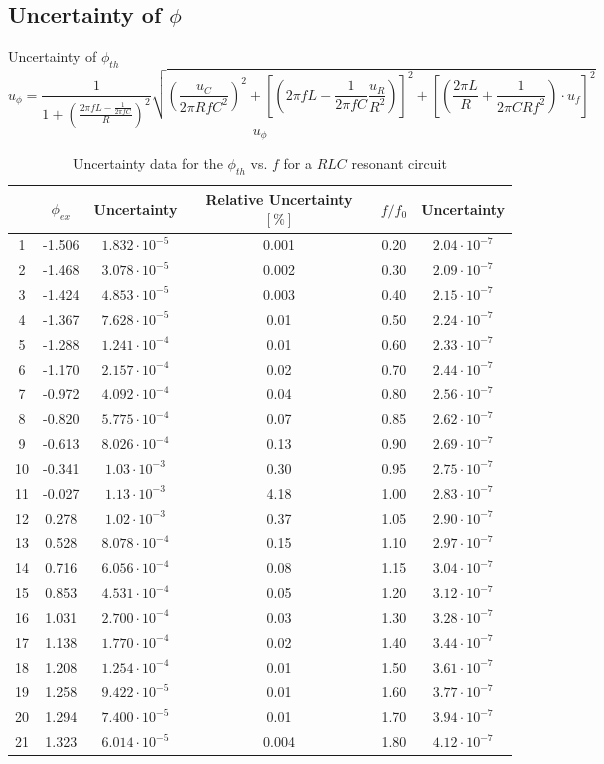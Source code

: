 \documentclass[12pt]{article}
\begin{document}
\subsection{Uncertainty of $\phi$}
\par Uncertainty of $\phi_{th}$
$$u_\phi=\frac{1}{1+(\frac{2\pi fL-\frac{1}{2\pi fC}}{R})^2}\sqrt{(\frac{u_C}{2\pi RfC^2})^2+[(2\pi fL-\frac{1}{2\pi fC}\frac{u_R}{R^2})]^2+[(\frac{2\pi L}{R}+\frac{1}{2\pi CRf^2})\cdot u_f]^2}$$
$$u_\phi$$
\begin{table}[H]
\centering
\begin{tabular}{|c|c|c|c|c|c|}
\hline
   &$\phi_{ex}$&Uncertainty&Relative Uncertainty $[\%]$&$f/f_0$&Uncertainty       \\ \hline
1  &-1.506&$1.832\cdot10^{-5}$&0.001&0.20&$2.04\cdot10^{-7}$       \\ \hline
2  &-1.468&$3.078\cdot10^{-5}$&0.002&0.30&$2.09\cdot10^{-7}$       \\ \hline
3  &-1.424&$4.853\cdot10^{-5}$&0.003&0.40&$2.15\cdot10^{-7}$       \\ \hline
4  &-1.367&$7.628\cdot10^{-5}$&0.01&0.50&$2.24\cdot10^{-7}$       \\ \hline
5  &-1.288&$1.241\cdot10^{-4}$&0.01&0.60&$2.33\cdot10^{-7}$       \\ \hline
6  &-1.170&$2.157\cdot10^{-4}$&0.02&0.70&$2.44\cdot10^{-7}$       \\ \hline
7  &-0.972&$4.092\cdot10^{-4}$&0.04&0.80&$2.56\cdot10^{-7}$       \\ \hline
8  &-0.820&$5.775\cdot10^{-4}$&0.07&0.85&$2.62\cdot10^{-7}$       \\ \hline
9  &-0.613&$8.026\cdot10^{-4}$&0.13&0.90&$2.69\cdot10^{-7}$       \\ \hline
10 &-0.341&$1.03\cdot10^{-3} $&0.30&0.95&$2.75\cdot10^{-7}$       \\ \hline
11 &-0.027&$1.13\cdot10^{-3}$ &4.18&1.00&$2.83\cdot10^{-7}$       \\ \hline
12 & 0.278&$1.02\cdot10^{-3}$ &0.37&1.05&$2.90\cdot10^{-7}$       \\ \hline
13 & 0.528&$8.078\cdot10^{-4}$&0.15&1.10&$2.97\cdot10^{-7}$       \\ \hline
14 & 0.716&$6.056\cdot10^{-4}$&0.08&1.15&$3.04\cdot10^{-7}$       \\ \hline
15 & 0.853&$4.531\cdot10^{-4}$&0.05&1.20&$3.12\cdot10^{-7}$       \\ \hline
16 & 1.031&$2.700\cdot10^{-4}$&0.03&1.30&$3.28\cdot10^{-7}$       \\ \hline
17 & 1.138&$1.770\cdot10^{-4}$&0.02&1.40&$3.44\cdot10^{-7}$       \\ \hline
18 & 1.208&$1.254\cdot10^{-4}$&0.01&1.50&$3.61\cdot10^{-7}$       \\ \hline
19 & 1.258&$9.422\cdot10^{-5}$&0.01&1.60&$3.77\cdot10^{-7}$       \\ \hline
20 & 1.294&$7.400\cdot10^{-5}$&0.01&1.70&$3.94\cdot10^{-7}$       \\ \hline
21 & 1.323&$6.014\cdot10^{-5}$&0.004&1.80&$4.12\cdot10^{-7}$       \\ \hline
\end{tabular}
\caption{Uncertainty data for the $\phi_{th}$ vs. $f$ for a $RLC$ resonant circuit}
\end{table}
\end{document}

